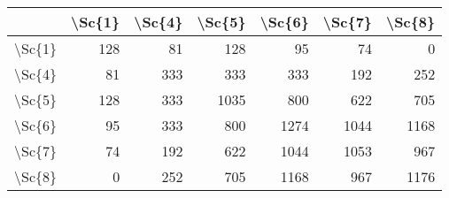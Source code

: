 \begin{tabular}{lrrrrrr}
\toprule
{} &  \textbackslash Sc\{1\} &  \textbackslash Sc\{4\} &  \textbackslash Sc\{5\} &  \textbackslash Sc\{6\} &  \textbackslash Sc\{7\} &  \textbackslash Sc\{8\} \\
\midrule
\textbackslash Sc\{1\} &     128 &      81 &     128 &      95 &      74 &       0 \\
\textbackslash Sc\{4\} &      81 &     333 &     333 &     333 &     192 &     252 \\
\textbackslash Sc\{5\} &     128 &     333 &    1035 &     800 &     622 &     705 \\
\textbackslash Sc\{6\} &      95 &     333 &     800 &    1274 &    1044 &    1168 \\
\textbackslash Sc\{7\} &      74 &     192 &     622 &    1044 &    1053 &     967 \\
\textbackslash Sc\{8\} &       0 &     252 &     705 &    1168 &     967 &    1176 \\
\bottomrule
\end{tabular}
